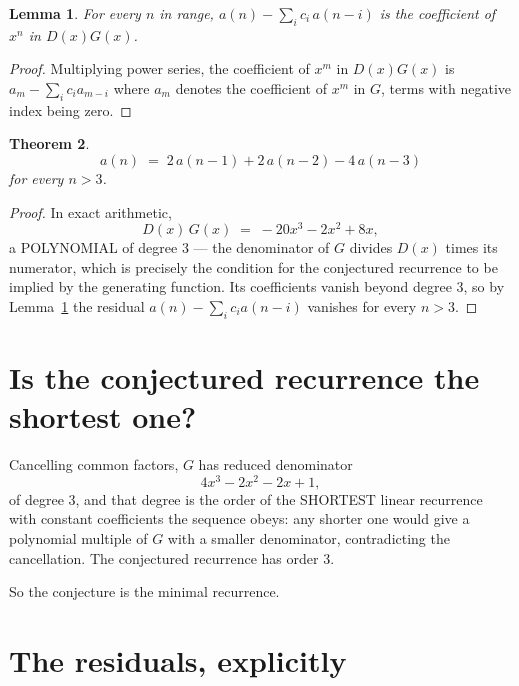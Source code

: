 \documentclass[11pt,a4paper]{article}
\theoremstyle{plain}
\newtheorem{theorem}{Theorem}
\newtheorem{lemma}[theorem]{Lemma}
\theoremstyle{definition}
\begin{document}
\begin{lemma}\label{lem:key}
For every $n$ in range, $a(n)-\sum_i c_i\,a(n-i)$ is the coefficient of $x^{n}$ in
$D(x)G(x)$.
\end{lemma}

\begin{proof}
Multiplying power series, the coefficient of $x^{m}$ in $D(x)G(x)$ is
$a_m-\sum_i c_i a_{m-i}$ where $a_m$ denotes the coefficient of $x^{m}$ in $G$, terms with
negative index being zero.
\end{proof}

\begin{theorem}
\[
a(n)\;=\;2\,a(n-1) + 2\,a(n-2) - 4\,a(n-3)
\]
for every $n>3$.
\end{theorem}

\begin{proof}
In exact arithmetic,
\[
D(x)\,G(x)\;=\;- 20 x^{3} - 2 x^{2} + 8 x,
\]
a POLYNOMIAL of degree $3$ --- the denominator of $G$ divides $D(x)$ times its numerator,
which is precisely the condition for the conjectured recurrence to be implied by the
generating function. Its coefficients vanish beyond degree $3$, so by
Lemma~\ref{lem:key} the residual $a(n)-\sum_ic_ia(n-i)$ vanishes for every
$n>3$.
\end{proof}

\section{Is the conjectured recurrence the shortest one?}

Cancelling common factors, $G$ has reduced denominator
\[
4 x^{3} - 2 x^{2} - 2 x + 1,
\]
of degree $3$, and that degree is the order of the SHORTEST linear recurrence with
constant coefficients the sequence obeys: any shorter one would give a polynomial multiple of
$G$ with a smaller denominator, contradicting the cancellation. The conjectured recurrence has
order $3$.

So the conjecture is the minimal recurrence.

\section{The residuals, explicitly}
\end{document}
